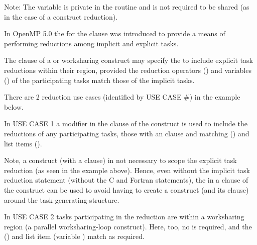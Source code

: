 Note: The  variable is private in the  routine
and is not required to be shared (as in the case of a  construct
reduction).




In OpenMP 5.0 the   for the  clause was
introduced to provide a means of performing reductions among implicit and explicit tasks.

The  clause of a  or worksharing construct may
specify the   to include explicit task reductions
within their region, provided the reduction operators ()
and variables () of the participating tasks match those of the
implicit tasks.

There are 2 reduction use cases (identified by USE CASE \#) in the  example below.  

In USE CASE 1 a  modifier in the  clause 
of the  construct is used to include the reductions of any 
participating tasks, those with an  clause and matching 
 (\code{+}) and list items ().  

Note, a  construct (with a  clause) in not
necessary to scope the explicit task reduction (as seen in the example above). 
Hence, even without the implicit task reduction statement (without the C   
and Fortran  statements), the   
in a  clause of the  construct
can be used to avoid having to create a  construct 
(and its  clause) around the task generating structure.

In USE CASE 2 tasks participating in the reduction are within a
worksharing region (a parallel worksharing-loop construct).
Here, too, no  is required, and the  (\code{+})
and list item (variable ) match as required.





